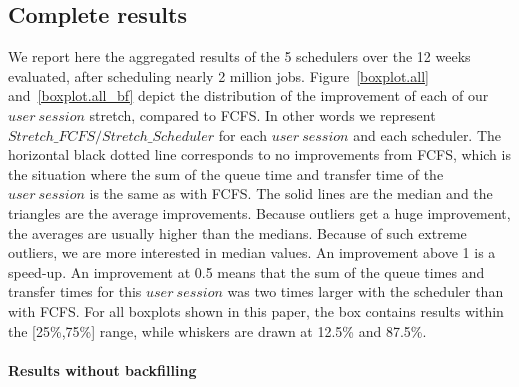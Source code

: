 \documentclass[conference]{IEEEtran}
\newcommand{\us}{\ensuremath{\mathit{user~session}}\xspace}
\begin{document}


\subsection{Complete results}

We report here the aggregated results of the 5 schedulers over the 12 weeks evaluated, after scheduling nearly 2 million jobs.
Figure~\ref{boxplot.all} and~\ref{boxplot.all_bf} depict 
the distribution of the improvement of each of our \us stretch, compared to FCFS.
In other words we represent $\mathit{Stretch\_FCFS}/\mathit{Stretch\_Scheduler}$ for each \us and each scheduler.
The horizontal black dotted line corresponds to no improvements from FCFS, which
is the situation where the sum of the queue time and transfer time of the \us is the same as with FCFS.
The solid lines are the median and the triangles are the average
improvements.
Because outliers get a huge improvement, the averages are usually higher than the medians.
Because of such extreme outliers, we are more interested in median values.
An improvement above 1 is a speed-up. An improvement at 0.5 means that
the sum of the queue times and transfer times for this \us was two
times larger with the scheduler than with FCFS.
For all boxplots shown in this paper, the box contains results within
the [25\%,75\%] range, while whiskers are drawn at 12.5\% and 87.5\%.


\paragraph{Results without backfilling}
\end{document}
